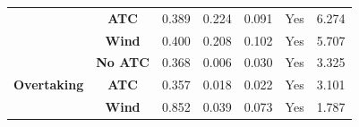 \begin{table}
\begin{tabular}{ccccccc}
                                                                                                        & \textbf{ATC}                    & 0.389                 & 0.224                 & 0.091                        & Yes                                                                                                   & 6.274                                                                                                    \\
                                                                                                        & \textbf{Wind}                   & 0.400                 & 0.208                 & 0.102                        & Yes                                                                                                   & 5.707                                                                                                    \\ 
        \cline{2-7}
        \multirow{3}{*}{\textbf{Overtaking}}                                                            & \textbf{No ATC}                 & 0.368            & 0.006            & 0.030                   & Yes                                                                                                & 3.325                                                                                               \\
                                                                                                        & \textbf{ATC}                    & 0.357            & 0.018            & 0.022                   & Yes                                                                                                & 3.101                                                                                               \\
                                                                                                        & \textbf{Wind}                   & 0.852            & 0.039            & 0.073                   & Yes                                                                                                & 1.787                                                                                               \\
        \bottomrule
        \end{tabular}
        \end{table}
        
